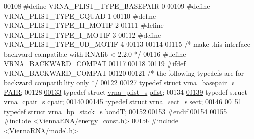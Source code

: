 \begin{DoxyCode}
00108 \textcolor{preprocessor}{#define VRNA\_PLIST\_TYPE\_BASEPAIR      0}
00109 \textcolor{preprocessor}{#define VRNA\_PLIST\_TYPE\_GQUAD         1}
00110 \textcolor{preprocessor}{#define VRNA\_PLIST\_TYPE\_H\_MOTIF       2}
00111 \textcolor{preprocessor}{#define VRNA\_PLIST\_TYPE\_I\_MOTIF       3}
00112 \textcolor{preprocessor}{#define VRNA\_PLIST\_TYPE\_UD\_MOTIF      4}
00113 
00114 
00115 \textcolor{comment}{/* make this interface backward compatible with RNAlib < 2.2.0 */}
00116 \textcolor{preprocessor}{#define VRNA\_BACKWARD\_COMPAT}
00117 
00118 
00119 \textcolor{preprocessor}{#ifdef VRNA\_BACKWARD\_COMPAT}
00120 
00121 \textcolor{comment}{/* the following typedefs are for backward compatibility only */}
00122 
\hypertarget{data__structures_8h_source.tex_l00127}{}\hyperlink{group__data__structures_ga4381025ffbd692e54189b2c679c79c99}{00127} \textcolor{keyword}{typedef} \textcolor{keyword}{struct }\hyperlink{group__data__structures_structvrna__basepair__s}{vrna\_basepair\_s}  \hyperlink{group__data__structures_structvrna__basepair__s}{PAIR};
00128 
\hypertarget{data__structures_8h_source.tex_l00133}{}\hyperlink{group__data__structures_gab1d8894b43aa84cbc50b862a73785fbc}{00133} \textcolor{keyword}{typedef} \textcolor{keyword}{struct }\hyperlink{group__data__structures_structvrna__plist__s}{vrna\_plist\_s}     \hyperlink{group__data__structures_structvrna__plist__s}{plist};
00134 
\hypertarget{data__structures_8h_source.tex_l00139}{}\hyperlink{group__data__structures_ga8412f116a2eb07b59ade9e14ca7c5ef1}{00139} \textcolor{keyword}{typedef} \textcolor{keyword}{struct }\hyperlink{group__data__structures_structvrna__cpair__s}{vrna\_cpair\_s}     \hyperlink{group__data__structures_structvrna__cpair__s}{cpair};
00140 
\hypertarget{data__structures_8h_source.tex_l00145}{}\hyperlink{group__data__structures_gaaacedee1f05d3d45aa6764eca51a8876}{00145} \textcolor{keyword}{typedef} \textcolor{keyword}{struct }\hyperlink{group__data__structures_structvrna__sect__s}{vrna\_sect\_s}      \hyperlink{group__data__structures_structvrna__sect__s}{sect};
00146 
\hypertarget{data__structures_8h_source.tex_l00151}{}\hyperlink{group__data__structures_gaaeed53a7508c6ce549a98223e94b25df}{00151} \textcolor{keyword}{typedef} \textcolor{keyword}{struct }\hyperlink{group__data__structures_structvrna__bp__stack__s}{vrna\_bp\_stack\_s}  \hyperlink{group__data__structures_structvrna__bp__stack__s}{bondT};
00152 
00153 \textcolor{preprocessor}{#endif}
00154 
00155 \textcolor{preprocessor}{#include <\hyperlink{energy__const_8h}{ViennaRNA/energy\_const.h}>}
00156 \textcolor{preprocessor}{#include <\hyperlink{model_8h}{ViennaRNA/model.h}>}

\end{DoxyCode}
